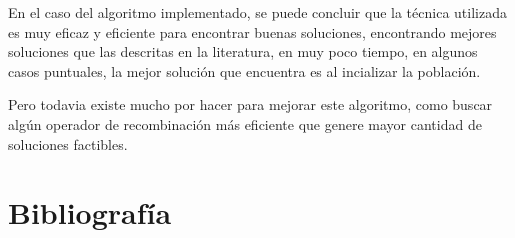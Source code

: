 \documentclass[letter, 10pt]{article}
\begin{document}
En el caso del algoritmo implementado, se puede concluir que la técnica utilizada es muy eficaz y eficiente para encontrar buenas soluciones, encontrando mejores soluciones que las descritas en la literatura, en muy poco tiempo, en algunos casos puntuales, la mejor solución que encuentra es al incializar la población. 

Pero todavia existe mucho por hacer para mejorar este algoritmo, como buscar algún operador de recombinación más eficiente que genere mayor cantidad de soluciones factibles.

\section{Bibliograf\'ia}


\end{document}
